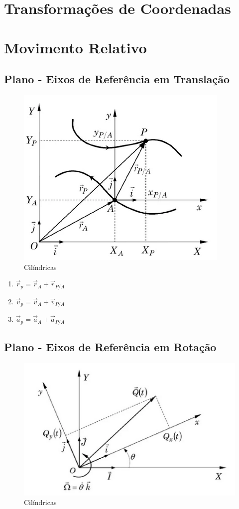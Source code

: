 \documentclass[a4paper, 12pt]{article}
\begin{document}
\section{Transformações de Coordenadas}
\newpage

\section{Movimento Relativo}
	\subsection{Plano - Eixos de Referência em Translação}
	\begin{figure}[h]
		\center
		\includegraphics[scale=0.5]{imagens/r.png} 
		\caption{Cilíndricas}
	\end{figure}	

	\begin{enumerate}
		\item $\vec{r}_p = \vec{r}_A + \vec{r}_{P/A}$
		\item $\vec{v}_p = \vec{v}_A + \vec{v}_{P/A}$
		\item $\vec{a}_p = \vec{a}_A + \vec{a}_{P/A}$
	\end{enumerate}

	\subsection{Plano - Eixos de Referência em Rotação}
		\begin{figure}[h]
			\center
			\includegraphics[scale=0.5]{imagens/rr.png} 
			\caption{Cilíndricas}
		\end{figure}	
\end{document}
